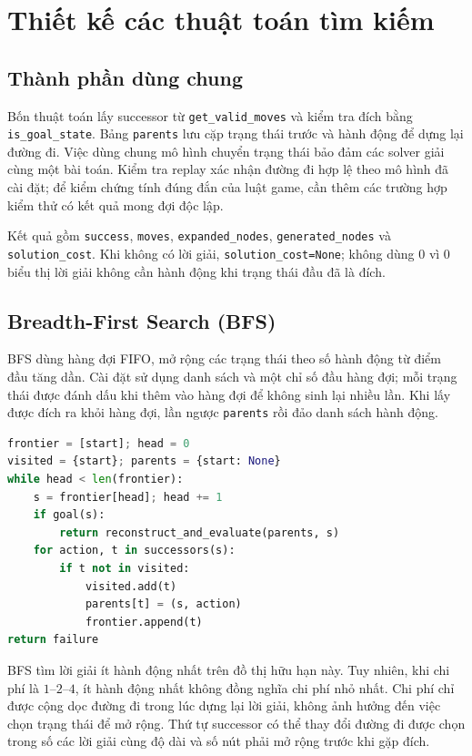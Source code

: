 
\section{Thiết kế các thuật toán tìm kiếm}
\subsection{Thành phần dùng chung}
Bốn thuật toán lấy successor từ \texttt{get\_valid\_moves} và kiểm tra đích bằng \texttt{is\_goal\_state}. Bảng \texttt{parents} lưu cặp trạng thái trước và hành động để dựng lại đường đi. Việc dùng chung mô hình chuyển trạng thái bảo đảm các solver giải cùng một bài toán. Kiểm tra replay xác nhận đường đi hợp lệ theo mô hình đã cài đặt; để kiểm chứng tính đúng đắn của luật game, cần thêm các trường hợp kiểm thử có kết quả mong đợi độc lập.

Kết quả gồm \texttt{success}, \texttt{moves}, \texttt{expanded\_nodes}, \texttt{generated\_nodes} và \texttt{solution\_cost}. Khi không có lời giải, \texttt{solution\_cost=None}; không dùng $0$ vì $0$ biểu thị lời giải không cần hành động khi trạng thái đầu đã là đích.

\subsection{Breadth-First Search (BFS)}
BFS dùng hàng đợi FIFO, mở rộng các trạng thái theo số hành động từ điểm đầu tăng dần. Cài đặt sử dụng danh sách và một chỉ số đầu hàng đợi; mỗi trạng thái được đánh dấu khi thêm vào hàng đợi để không sinh lại nhiều lần. Khi lấy được đích ra khỏi hàng đợi, lần ngược \texttt{parents} rồi đảo danh sách hành động.

\noindent\begin{minipage}{\linewidth}
\begin{lstlisting}[language=Python,caption={Mã giả BFS theo cài đặt của nhóm}]
frontier = [start]; head = 0
visited = {start}; parents = {start: None}
while head < len(frontier):
    s = frontier[head]; head += 1
    if goal(s):
        return reconstruct_and_evaluate(parents, s)
    for action, t in successors(s):
        if t not in visited:
            visited.add(t)
            parents[t] = (s, action)
            frontier.append(t)
return failure
\end{lstlisting}
\end{minipage}
BFS tìm lời giải ít hành động nhất trên đồ thị hữu hạn này. Tuy nhiên, khi chi phí là $1$--$2$--$4$, ít hành động nhất không đồng nghĩa chi phí nhỏ nhất. Chi phí chỉ được cộng dọc đường đi trong lúc dựng lại lời giải, không ảnh hưởng đến việc chọn trạng thái để mở rộng. Thứ tự successor có thể thay đổi đường đi được chọn trong số các lời giải cùng độ dài và số nút phải mở rộng trước khi gặp đích.


